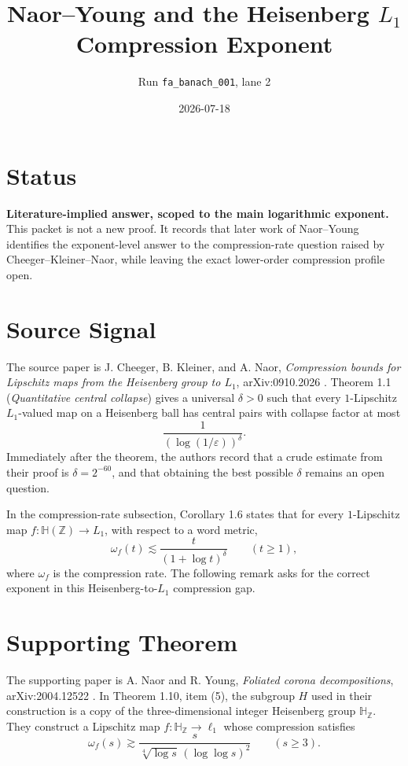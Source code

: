 \documentclass[11pt]{article}
\title{Naor--Young and the Heisenberg \(L_1\) Compression Exponent}
\author{Run \texttt{fa\_banach\_001}, lane 2}
\date{2026-07-18}
\begin{document}
\maketitle

\section*{Status}

\textbf{Literature-implied answer, scoped to the main logarithmic exponent.}
This packet is not a new proof.  It records that later work of Naor--Young
identifies the exponent-level answer to the compression-rate question raised
by Cheeger--Kleiner--Naor, while leaving the exact lower-order compression
profile open.

\section*{Source Signal}

The source paper is J. Cheeger, B. Kleiner, and A. Naor,
\emph{Compression bounds for Lipschitz maps from the Heisenberg group to
\(L_1\)}, arXiv:0910.2026 \cite{CKN}.  Theorem 1.1
(\emph{Quantitative central collapse}) gives a universal
\(\delta>0\) such that every \(1\)-Lipschitz \(L_1\)-valued map on a
Heisenberg ball has central pairs with collapse factor at most
\[
  \frac{1}{(\log(1/\varepsilon))^\delta}.
\]
Immediately after the theorem, the authors record that a crude estimate from
their proof is \(\delta=2^{-60}\), and that obtaining the best possible
\(\delta\) remains an open question.

In the compression-rate subsection, Corollary 1.6 states that for every
\(1\)-Lipschitz map \(f:\mathbb H(\mathbb Z)\to L_1\), with respect to a word
metric,
\[
  \omega_f(t)\lesssim \frac{t}{(1+\log t)^\delta}\qquad (t\ge 1),
\]
where \(\omega_f\) is the compression rate.  The following remark asks for the
correct exponent in this Heisenberg-to-\(L_1\) compression gap.

\section*{Supporting Theorem}

The supporting paper is A. Naor and R. Young,
\emph{Foliated corona decompositions}, arXiv:2004.12522 \cite{NY}.  In
Theorem 1.10, item (5), the subgroup \(H\) used in their construction is a
copy of the three-dimensional integer Heisenberg group \(\mathbb H_{\mathbb Z}\).
They construct a Lipschitz map \(f:\mathbb H_{\mathbb Z}\to\ell_1\) whose
compression satisfies
\[
  \omega_f(s)\gtrsim
  \frac{s}{\sqrt[4]{\log s}\,(\log\log s)^2}
  \qquad (s\ge 3).
\]
\end{document}
